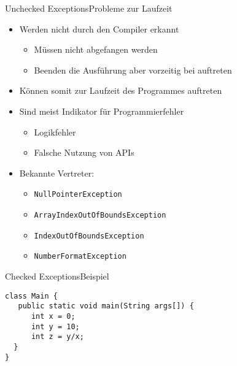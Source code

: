 \begin{frame}{Unchecked Exceptions}{Probleme zur Laufzeit}
    \begin{itemize}[<+->]
        \item Werden nicht durch den Compiler erkannt
        \begin{itemize}
            \item Müssen nicht abgefangen werden
            \item Beenden die Ausführung aber vorzeitig bei auftreten
        \end{itemize}
        \item Können somit zur Laufzeit des Programmes auftreten
        \item Sind meist Indikator für Programmierfehler
        \begin{itemize}
            \item Logikfehler
            \item Falsche Nutzung von APIs
        \end{itemize}
        \item Bekannte Vertreter:
        \begin{itemize}
            \item \texttt{NullPointerException}
            \item \texttt{ArrayIndexOutOfBoundsException}
            \item \texttt{IndexOutOfBoundsException}
            \item \texttt{NumberFormatException}
        \end{itemize}
    \end{itemize}
\end{frame}

\begin{frame}[fragile]{Checked Exceptions}{Beispiel}
\lstset{style=java}
\begin{lstlisting}
class Main { 
   public static void main(String args[]) { 
      int x = 0; 
      int y = 10; 
      int z = y/x; 
  } 
}
\end{lstlisting}
\end{frame}

